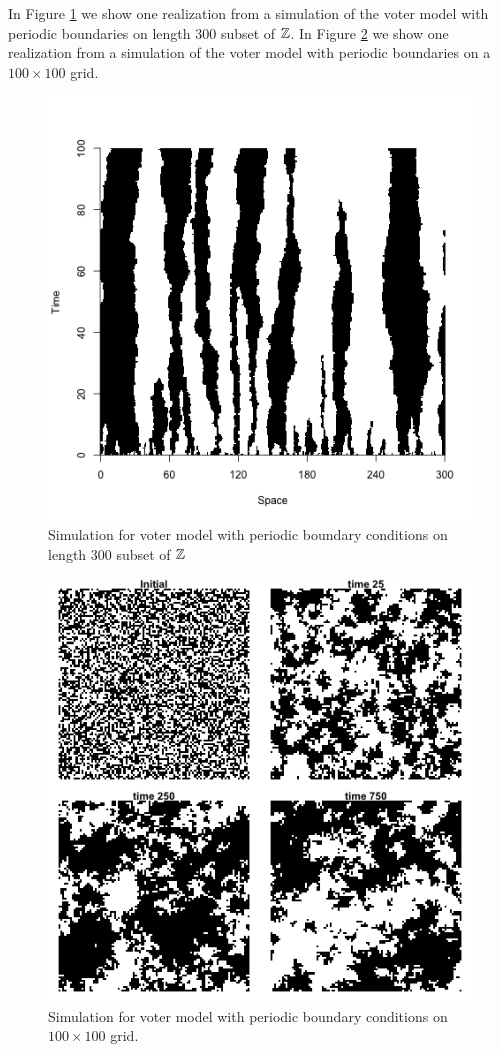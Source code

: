 In Figure \ref{fig:voter_sim_1d_torus.png} we show one realization from a simulation of the voter model with periodic boundaries on length 300 subset of $\mathbb{Z}$.
In Figure \ref{fig:voter_sim_2d_torus.png} we show one realization from a simulation of the voter model with periodic boundaries on a $100 \times 100$ grid.

\begin{figure}[H]
  \centering
    \includegraphics[width=.80\textwidth]{figures/voter_simulation_1d_300.png}
   \caption{Simulation for voter model with periodic boundary conditions on length 300 subset of $\mathbb{Z}$}
  \label{fig:voter_sim_1d_torus.png}
\end{figure}

\begin{figure}[H]
  \centering
    \includegraphics[width=.80\textwidth]{figures/voter_simulation_torus_100.png}
   \caption{Simulation for voter model with periodic boundary conditions on $100 \times 100$ grid.}
  \label{fig:voter_sim_2d_torus.png}
\end{figure}

